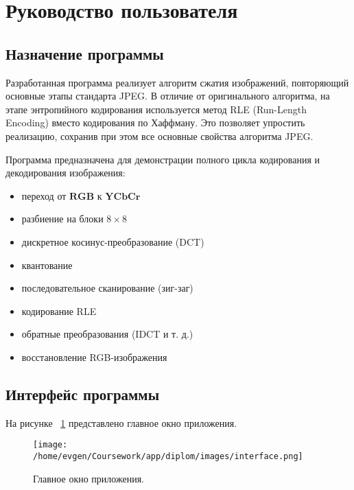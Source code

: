 \section{Руководство пользователя}

\subsection{Назначение программы}

Разработанная программа реализует алгоритм сжатия изображений, повторяющий основные этапы стандарта JPEG. 
В отличие от оригинального алгоритма, на этапе энтропийного кодирования используется метод RLE (Run-Length Encoding) 
вместо кодирования по Хаффману. 
Это позволяет упростить реализацию, сохранив при этом все основные свойства алгоритма JPEG.

Программа предназначена для демонстрации полного цикла кодирования и декодирования изображения:

\begin{itemize}
    \item переход от $\textbf{RGB}$ к $\textbf{YCbCr}$
    \item разбиение на блоки $8 \times 8$
    \item дискретное косинус-преобразование (DCT)
    \item квантование
    \item последовательное сканирование (зиг-заг)
    \item кодирование RLE
    \item обратные преобразования (IDCT и т. д.)
    \item восстановление RGB-изображения

\end{itemize}



\clearpage
\subsection{Интерфейс программы}

На рисунке ~\ref{fig:interface} представлено главное окно приложения.

\begin{figure}[h!]
    \centering
    \texttt{[image: /home/evgen/Coursework/app/diplom/images/interface.png]}
    \caption{Главное окно приложения.}
    \label{fig:interface}
\end{figure}



